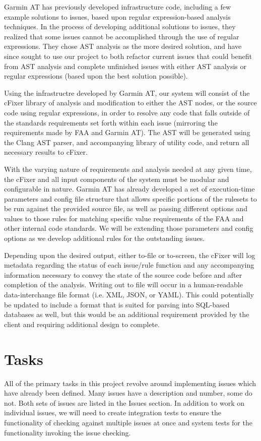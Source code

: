 \documentclass[11pt]{scrreprt}
\begin{document}
Garmin AT has previously developed infrastructure code, including a few example solutions to issues, based upon regular expression-based analysis techniques. In the process of developing additional solutions to issues, they realized that some issues cannot be accomplished through the use of regular expressions. They chose AST analysis as the more desired solution, and have since sought to use our project to both refactor current issues that could benefit from AST analysis and complete unfinished issues with either AST analysis or regular expressions (based upon the best solution possible).

Using the infrastructre developed by Garmin AT, our system will consist of the cFixer library of analysis and modification to either the AST nodes, or the source code using regular expressions, in order to resolve any code that falls outside of the standards requirements set forth within each issue (mirroring the requirements made by FAA and Garmin AT). The AST will be generated using the Clang AST parser, and accompanying library of utility code, and return all necessary results to cFixer.

With the varying nature of requirements and analysis needed at any given time, the cFixer and all input components of the system must be modular and configurable in nature. Garmin AT has already developed a set of execution-time parameters and config file structure that allows specific portions of the rulesets to be run against the provided source file, as well as passing different options and values to those rules for matching specific value requirements of the FAA and other internal code standards. We will be extending those parameters and config options as we develop additional rules for the outstanding issues.

Depending upon the desired output, either to-file or to-screen, the cFixer will log metadata regarding the status of each issue/rule function and any accompanying information necessary to convey the state of the source code before and after completion of the analysis. Writing out to file will occur in a human-readable data-interchange file format (i.e. XML, JSON, or YAML). This could potentially be updated to include a format that is suited for parsing into SQL-based databases as well, but this would be an additional requirement provided by the client and requiring additional design to complete.

\section{Tasks}
All of the primary tasks in this project revolve around implementing issues which have already been defined. Many issues have a description and number, some do not. Both sets of issues are listed in the Issues section. In addition to work on individual issues, we will need to create integration tests to ensure the functionality of checking against multiple issues at once and system tests for the functionality invoking the issue checking.
\end{document}

